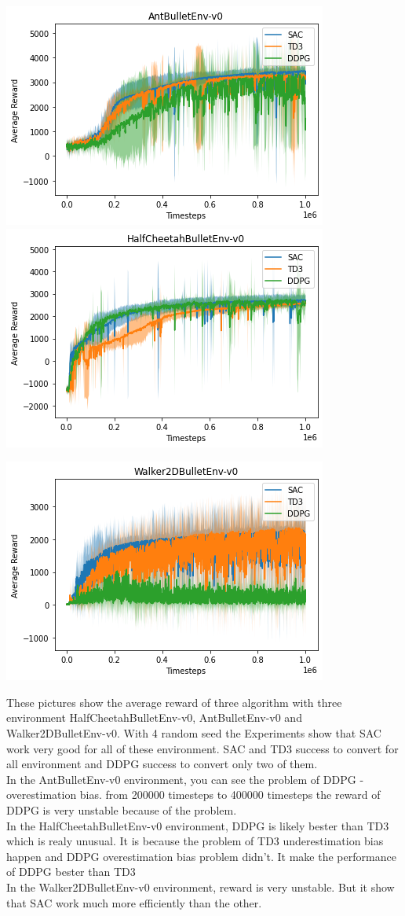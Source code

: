 \includegraphics[width=0.45\linewidth]{photo/Ant.png}
\includegraphics[width=0.45\linewidth]{photo/HalfCheetah.png}
\begin{center}
    \includegraphics[width=0.45\linewidth]{photo/Walker2D.png}
\end{center}

These pictures show the average reward of three algorithm with three environment HalfCheetahBulletEnv-v0, AntBulletEnv-v0 and Walker2DBulletEnv-v0. With 4 random seed the Experiments show that SAC work very good for all of these environment. SAC and TD3 success to convert for all environment and DDPG success to convert only two of them.\\
In the AntBulletEnv-v0 environment, you can see the problem of DDPG - overestimation bias. from 200000 timesteps to 400000 timesteps the reward of DDPG is very unstable because of the problem.\\
In the HalfCheetahBulletEnv-v0 environment, DDPG is likely bester than TD3 which is realy unusual. It is because the problem of TD3 underestimation bias happen and DDPG overestimation bias problem didn't. It make the performance of DDPG bester than TD3\\
In the Walker2DBulletEnv-v0 environment, reward is very unstable. But it show that SAC work much more efficiently than the other.

